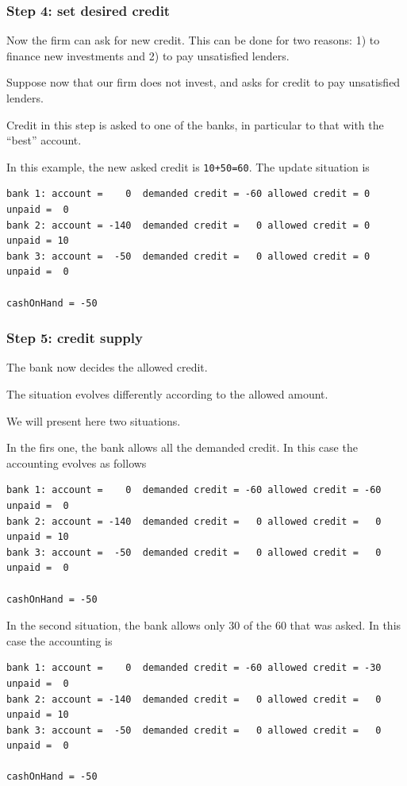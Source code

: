 \documentclass{book}
\begin{document}
\subsubsection*{Step 4: set desired credit}

Now the firm can ask for new credit. This can be done for two reasons: 1) to finance new investments and 2) to pay unsatisfied lenders.

Suppose now that our firm does not invest, and asks for credit to pay unsatisfied lenders.

Credit in this step is asked to one of the banks, in particular to that with the ``best'' account.

In this example, the new asked credit is \verb/10+50=60/. The update situation is 

\begin{verbatim}
bank 1: account =    0  demanded credit = -60 allowed credit = 0 unpaid =  0
bank 2: account = -140  demanded credit =   0 allowed credit = 0 unpaid = 10
bank 3: account =  -50  demanded credit =   0 allowed credit = 0 unpaid =  0

cashOnHand = -50
\end{verbatim}






\subsubsection*{Step 5: credit supply}

The bank now decides the allowed credit.

The situation evolves differently according to the allowed amount.

We will present here two situations. 

In the firs one, the bank allows all the demanded credit. In this case the accounting evolves as follows

\begin{verbatim}
bank 1: account =    0  demanded credit = -60 allowed credit = -60 unpaid =  0
bank 2: account = -140  demanded credit =   0 allowed credit =   0 unpaid = 10
bank 3: account =  -50  demanded credit =   0 allowed credit =   0 unpaid =  0

cashOnHand = -50
\end{verbatim}

In the second situation, the bank allows only 30 of the 60 that was asked. In this case the accounting is

\begin{verbatim}
bank 1: account =    0  demanded credit = -60 allowed credit = -30 unpaid =  0
bank 2: account = -140  demanded credit =   0 allowed credit =   0 unpaid = 10
bank 3: account =  -50  demanded credit =   0 allowed credit =   0 unpaid =  0

cashOnHand = -50
\end{verbatim}
\end{document}
